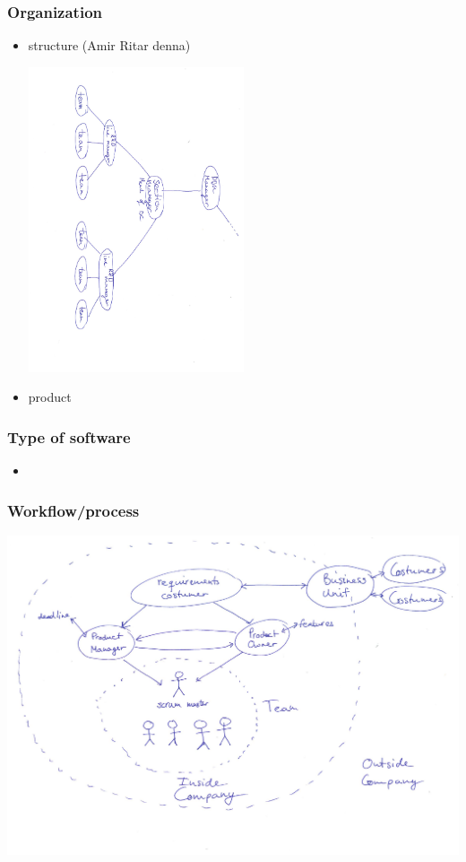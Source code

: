 \documentclass{beamer}
\begin{document}
\begin{frame}
  \frametitle{Organization}
  \begin{itemize}
  \item structure  (Amir Ritar denna)
    \begin{center}
    \includegraphics[width=0.5\textwidth, angle=90,origin=c]{figs/structure.pdf}
  \end{center}
  \item product
  \end{itemize}

\end{frame}

\begin{frame}
  \frametitle{Type of software}
  \begin{itemize}
  \item
  \end{itemize}
\end{frame}

\begin{frame}
  \frametitle{Workflow/process}
  \begin{center}
    \includegraphics[width=1\textwidth]{figs/scrum_setup.pdf}
  \end{center}
\end{frame}
\end{document}
